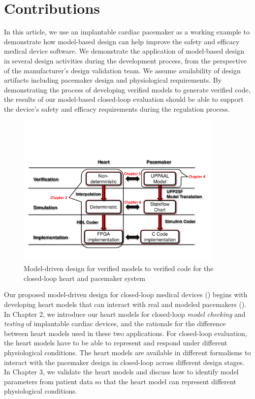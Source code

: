 \section{Contributions}
In this article, we use an implantable cardiac pacemaker as a working example to demonstrate how model-based design can help improve the safety and efficacy medical device software. We demonstrate the application of model-based design in several design activities during the development process, from the perspective of the manufacturer's design validation team. We assume availability of design artifacts including pacemaker design and physiological requirements. By demonstrating the process of developing verified models to generate verified code, the results of our model-based closed-loop evaluation should be able to support the device's safety and efficacy requirements during the regulation process.
\begin{figure}[t]
		\centering
		\includegraphics[width=0.9\textwidth]{figs/model_based_b.pdf}
		\caption{\small Model-driven design for verified models to verified code for the closed-loop heart and pacemaker system}
		\label{fig:modeling_overview}
\end{figure}

Our proposed model-driven design for closed-loop medical devices () begins with developing heart models that can interact with real and modeled pacemakers (\cite{VHM_proc}). In Chapter 2, we introduce our heart models for closed-loop  \emph{model checking} and  \emph{testing} of implantable cardiac devices, and the rationale for the difference between heart models used in these two applications. For closed-loop evaluation, the heart models have to be able to represent and respond under different physiological conditions. The heart models are available in different formalisms to interact with the pacemaker design in closed-loop across different design stages. In Chapter 3, we validate the heart models and discuss how to identify model parameters from patient data so that the heart model can represent different physiological conditions. 

